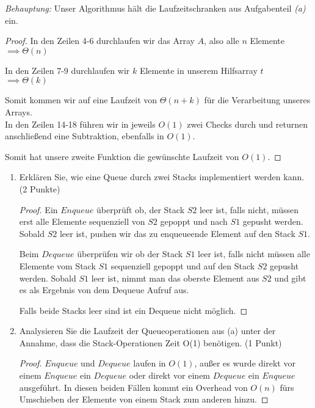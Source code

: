 \documentclass[ngerman,landscape,twocolumn]{adtexsheet}
\begin{document}
\emph{Behauptung:} Unser Algorithmus hält die Laufzeitschranken aus Aufgabenteil \emph{(a)} ein.
\begin{proof}
    In den Zeilen 4-6 durchlaufen wir das Array $A$, also alle $n$ Elemente\\
    $\implies \Theta(n)$
    
    In den Zeilen 7-9 durchlaufen wir $k$ Elemente in unserem Hilfsarray $t$\\
    $\implies \Theta(k)$
    
    Somit kommen wir auf eine Laufzeit von $\Theta(n+k)$ für die Verarbeitung unseres Arrays.\\
    In den Zeilen 14-18 führen wir in jeweils $O(1)$ zwei Checks durch und returnen anschließend eine Subtraktion, ebenfalls in $O(1)$.
    
    Somit hat unsere zweite Funktion die gewünschte Laufzeit von $O(1)$.
\end{proof}
\begin{question}
    \begin{enumerate}
        \item Erklären Sie, wie eine Queue durch zwei Stacks implementiert werden kann. (2 Punkte)
        
        \begin{proof}
            Ein $Enqueue$ überprüft ob, der Stack $S2$ leer ist, falls nicht, müssen erst alle Elemente sequenziell von $S2$ gepoppt und nach $S1$ gepusht werden. Sobald $S2$ leer ist, pushen wir das zu enqueueende Element auf den Stack $S1$.
            
            Beim $Dequeue$ überprüfen wir ob der Stack $S1$ leer ist, falls nicht müssen alle Elemente vom Stack $S1$ sequenziell gepoppt und auf den Stack $S2$ gepusht werden. Sobald $S1$ leer ist, nimmt man das oberste Element aus $S2$ und gibt es als Ergebnis von dem Dequeue Aufruf aus.
            
            Falls beide Stacks leer sind ist ein Dequeue nicht möglich.
        \end{proof}
        \item Analysieren Sie die Laufzeit der Queueoperationen aus (a) unter der Annahme, dass die Stack-Operationen Zeit O(1) benötigen. (1 Punkt)
        \begin{proof}
            $Enqueue$ und $Dequeue$ laufen in $O(1)$, außer es wurde direkt vor einem $Enqueue$ ein $Dequeue$ oder direkt vor einem $Dequeue$ ein $Enqueue$ ausgeführt. In diesen beiden Fällen kommt ein Overhead von $O(n)$ fürs Umschieben der Elemente von einem Stack zum anderen hinzu.
        \end{proof}
    \end{enumerate} 
\end{question}
\end{document}
